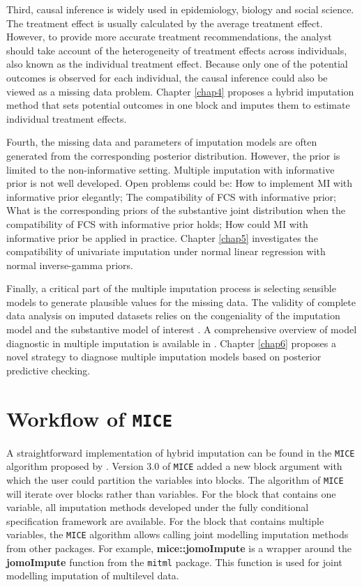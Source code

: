 Third, causal inference is widely used in epidemiology, biology and social science. The treatment effect is usually calculated by the average treatment effect. However, to provide more accurate treatment recommendations, the analyst should take account of the heterogeneity of treatment effects across individuals, also known as the individual treatment effect. Because only one of the potential outcomes is observed for each individual, the causal inference could also be viewed as a missing data problem. Chapter \ref{chap4} proposes a hybrid imputation method that sets potential outcomes in one block and imputes them to estimate individual treatment effects.

Fourth, the missing data and parameters of imputation models are often generated from the corresponding posterior distribution. However, the prior is limited to the non-informative setting. Multiple imputation with informative prior is not well developed. Open problems could be: How to implement MI with informative prior elegantly; The compatibility of FCS with informative prior; What is the corresponding priors of the substantive joint distribution when the compatibility of FCS with informative prior holds; How could MI with informative prior be applied in practice. Chapter \ref{chap5} investigates the compatibility of univariate imputation under normal linear regression with normal inverse-gamma priors.

Finally, a critical part of the multiple imputation process is selecting sensible models to generate plausible values for the missing data. The validity of complete data analysis on imputed datasets relies on the congeniality of the imputation model and the substantive model of interest \citep{meng1994multiple}. A comprehensive overview of model diagnostic in multiple imputation is available in \citet{nguyen2017model}. Chapter \ref{chap6} proposes a novel strategy to diagnose multiple imputation models based on posterior predictive checking. 

\section{Workflow of \texttt{MICE}}
A straightforward implementation of hybrid imputation can be found in the \texttt{MICE} algorithm proposed by \citet{Buuren2011}. Version 3.0 of \texttt{MICE} added a new block argument with which the user could partition the variables into blocks. The algorithm of \texttt{MICE} will iterate over blocks rather than variables. For the block that contains one variable, all imputation methods developed under the fully conditional specification framework are available. For the block that contains multiple variables, the \texttt{MICE} algorithm allows calling joint modelling imputation methods from other packages. For example, \textbf{mice::jomoImpute} is a wrapper around the \textbf{jomoImpute} function from the \texttt{mitml} package. This function is used for joint modelling imputation of multilevel data. 

